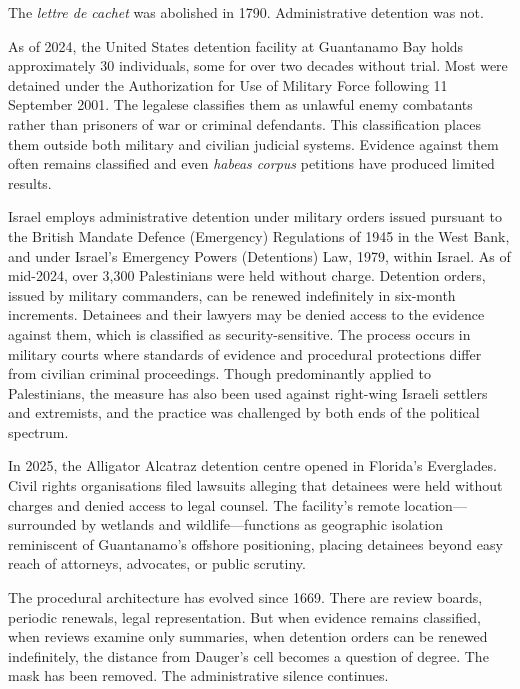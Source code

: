\begin{commentary}
The \textit{lettre de cachet} was abolished in 1790. Administrative detention was not.

As of 2024, the United States detention facility at Guantanamo Bay holds approximately 30 individuals, some for over two decades without trial. Most were detained under the Authorization for Use of Military Force following 11 September 2001. The legalese classifies them as \QSOpen{}unlawful enemy combatants\QSClose{} rather than prisoners of war or criminal defendants. This classification places them outside both military and civilian judicial systems. Evidence against them often remains classified and even \textit{habeas corpus} petitions have produced limited results. 

Israel employs administrative detention under military orders issued pursuant to the British Mandate Defence (Emergency) Regulations of 1945 in the West Bank, and under Israel's Emergency Powers (Detentions) Law, 1979, within Israel. As of mid-2024, over 3,300 Palestinians were held without charge. Detention orders, issued by military commanders, can be renewed indefinitely in six-month increments. Detainees and their lawyers may be denied access to the evidence against them, which is classified as security-sensitive. The process occurs in military courts where standards of evidence and procedural protections differ from civilian criminal proceedings. Though predominantly applied to Palestinians, the measure has also been used against right-wing Israeli settlers and extremists, and the practice was challenged by both ends of the political spectrum.

In 2025, the \QSOpen{}Alligator Alcatraz\QSClose{} detention centre opened in Florida's Everglades. Civil rights organisations filed lawsuits alleging that detainees were held without charges and denied access to legal counsel. The facility's remote location—surrounded by wetlands and wildlife—functions as geographic isolation reminiscent of Guantanamo's offshore positioning, placing detainees beyond easy reach of attorneys, advocates, or public scrutiny.

The procedural architecture has evolved since 1669. There are review boards, periodic renewals, legal representation. But when evidence remains classified, when reviews examine only summaries, when detention orders can be renewed indefinitely, the distance from Dauger's cell becomes a question of degree. The mask has been removed. The administrative silence continues.
\end{commentary}
